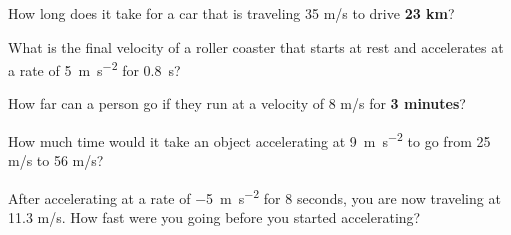 \documentclass[10pt]{exam}
\begin{document}
\begin{questions}

\question
  How long does it take for a car that is traveling 
  35 m/s to drive {\bf 23 km}?
  \vs



\question
  What is the final velocity of a roller coaster 
  that starts at rest and accelerates at a rate of 
  \SI{5}{\meter\per\second^2} for 0.8~s?
  \vs


\question
  How far can a person go if they run at a velocity of 
  8 m/s for {\bf 3 minutes}?
  \vs


\question
  How much time would it take an object accelerating 
  at \SI{9}{\meter\per\second^2} to go from 25 m/s to 56 m/s?
  \vs


\question
  After accelerating at a rate of \SI{-5}{\meter\per\second^2}
  for 8 seconds, you are now traveling at 11.3 m/s.  How fast 
  were you going before you started accelerating?
  \vs




 
\end{questions}
\end{document}
